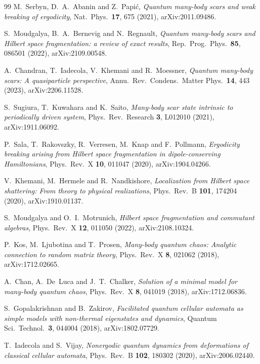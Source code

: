 \begin{thebibliography}{99}
 M.~Serbyn, D.~A.~Abanin and Z.~Papi\'c,
  \emph{Quantum many-body scars and weak breaking of ergodicity},
  Nat.\ Phys.\ \textbf{17}, 675 (2021), arXiv:2011.09486.

 S.~Moudgalya, B.~A.~Bernevig and N.~Regnault,
  \emph{Quantum many-body scars and Hilbert space fragmentation: a review of
  exact results}, Rep.\ Prog.\ Phys.\ \textbf{85}, 086501 (2022),
  arXiv:2109.00548.

 A.~Chandran, T.~Iadecola, V.~Khemani and R.~Moessner,
  \emph{Quantum many-body scars: A quasiparticle perspective},
  Annu.\ Rev.\ Condens.\ Matter Phys.\ \textbf{14}, 443 (2023),
  arXiv:2206.11528.

 S.~Sugiura, T.~Kuwahara and K.~Saito,
  \emph{Many-body scar state intrinsic to periodically driven system},
  Phys.\ Rev.\ Research \textbf{3}, L012010 (2021), arXiv:1911.06092.

 P.~Sala, T.~Rakovszky, R.~Verresen, M.~Knap and
  F.~Pollmann, \emph{Ergodicity breaking arising from Hilbert space
  fragmentation in dipole-conserving Hamiltonians}, Phys.\ Rev.\ X
  \textbf{10}, 011047 (2020), arXiv:1904.04266.

 V.~Khemani, M.~Hermele and R.~Nandkishore,
  \emph{Localization from Hilbert space shattering: From theory to physical
  realizations}, Phys.\ Rev.\ B \textbf{101}, 174204 (2020), arXiv:1910.01137.

 S.~Moudgalya and O.~I.~Motrunich,
  \emph{Hilbert space fragmentation and commutant algebras},
  Phys.\ Rev.\ X \textbf{12}, 011050 (2022), arXiv:2108.10324.

 P.~Kos, M.~Ljubotina and T.~Prosen,
  \emph{Many-body quantum chaos: Analytic connection to random matrix theory},
  Phys.\ Rev.\ X \textbf{8}, 021062 (2018), arXiv:1712.02665.

 A.~Chan, A.~De~Luca and J.~T.~Chalker,
  \emph{Solution of a minimal model for many-body quantum chaos},
  Phys.\ Rev.\ X \textbf{8}, 041019 (2018), arXiv:1712.06836.

 S.~Gopalakrishnan and B.~Zakirov,
  \emph{Facilitated quantum cellular automata as simple models with non-thermal
  eigenstates and dynamics}, Quantum Sci.\ Technol.\ \textbf{3}, 044004 (2018),
  arXiv:1802.07729.

 T.~Iadecola and S.~Vijay,
  \emph{Nonergodic quantum dynamics from deformations of classical cellular
  automata}, Phys.\ Rev.\ B \textbf{102}, 180302 (2020), arXiv:2006.02440.


\end{thebibliography}
